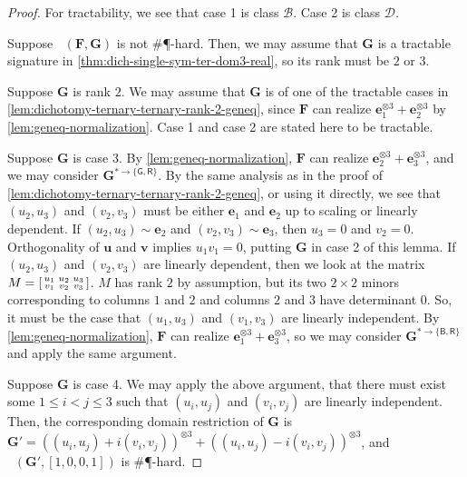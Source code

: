 \documentclass[11pt]{article}
\DeclareMathOperator{\holbs}{Holant^*_2}
\DeclareMathOperator{\holts}{Holant^*_3}
\newcommand{\db}{\mathsf{B}}
\newcommand{\dg}{\mathsf{G}}
\newcommand{\dr}{\mathsf{R}}
\newcommand{\sph}{\#\P-hard\xspace}
\newcommand{\teh}{^{\otimes 3}}
\newcommand{\domres}[1]{
  ^{*\to\{#1\}}
}
\newcommand{\tractE}{$\mathscr{B}$\xspace}
\newcommand{\tractBGR}{$\mathscr{D}$\xspace}
\begin{document}
\begin{proof}
  For tractability, we see that case 1 is class \tractE.
  Case 2 is class \tractBGR.

  Suppose $\holts(\mathbf{F}, \mathbf{G})$ is not \sph.
  Then, we may assume that $\mathbf{G}$ is a tractable signature in \cref{thm:dich-single-sym-ter-dom3-real}, so its rank must be $2$ or $3$.

  Suppose $\mathbf{G}$ is rank $2$.
  We may assume that $\mathbf{G}$ is of one of the tractable cases in \cref{lem:dichotomy-ternary-ternary-rank-2-geneq}, since $\mathbf{F}$ can realize $\mathbf{e}_1\teh + \mathbf{e}_2\teh$ by \cref{lem:geneq-normalization}.
  Case 1 and case 2 are stated here to be tractable.
  
  Suppose $\mathbf{G}$ is case 3.
  By \cref{lem:geneq-normalization}, $\mathbf{F}$ can realize $\mathbf{e}_2\teh + \mathbf{e}_3\teh$, and we may consider $\mathbf{G}\domres{\dg, \dr}$.
  By the same analysis as in the proof of \cref{lem:dichotomy-ternary-ternary-rank-2-geneq}, or using it directly, we see that $(u_2, u_3)$ and $(v_2, v_3)$ must be either $\mathbf{e}_1$ and $\mathbf{e}_2$ up to scaling or linearly dependent.
  If $(u_2, u_3) \sim \mathbf{e}_2$ and $(v_2, v_3) \sim \mathbf{e}_3$, then $u_3 = 0$ and $v_2 = 0$.
  Orthogonality of $\mathbf{u}$ and $\mathbf{v}$ implies $u_1 v_1 = 0$, putting $\mathbf{G}$ in case 2 of this lemma. 
  If $(u_2, u_3)$ and $(v_2, v_3)$ are linearly dependent, then we look at the matrix 
  $M = \begin{bsmallmatrix}
    u_1 & u_2 & u_3 \\
    v_1 & v_2 & v_3
  \end{bsmallmatrix}$.
  $M$ has rank $2$ by assumption, but its two $2 \times 2$ minors corresponding to columns $1$ and $2$ and columns $2$ and $3$ have determinant $0$.
  So, it must be the case that $(u_1, u_3)$ and $(v_1, v_3)$ are linearly independent.
  By \cref{lem:geneq-normalization}, $\mathbf{F}$ can realize $\mathbf{e}_1 \teh + \mathbf{e}_3 \teh$, so we may consider $\mathbf{G}\domres{\db, \dr}$ and apply the same argument.

  Suppose $\mathbf{G}$ is case 4.
  We may apply the above argument, that there must exist some $1 \le i < j \le 3$ such that $(u_i, u_j)$ and $(v_i, v_j)$ are linearly independent.
  Then, the corresponding domain restriction of $\mathbf{G}$ is $\mathbf{G}' = ((u_i, u_j) + i (v_i, v_j))\teh + ((u_i, u_j) - i (v_i, v_j))\teh$, 
  and $\holbs(\mathbf{G}', [1, 0, 0, 1])$ is \sph.


\end{proof}
\end{document}
